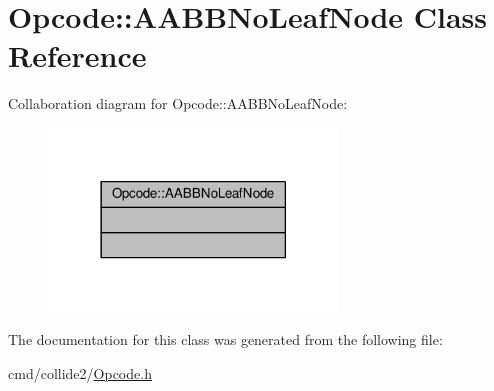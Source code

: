 \hypertarget{classOpcode_1_1AABBNoLeafNode}{}\section{Opcode\+:\+:A\+A\+B\+B\+No\+Leaf\+Node Class Reference}
\label{classOpcode_1_1AABBNoLeafNode}


Collaboration diagram for Opcode\+:\+:A\+A\+B\+B\+No\+Leaf\+Node\+:
\nopagebreak
\begin{figure}[H]
\begin{center}
\leavevmode
\includegraphics[width=218pt]{d8/dd6/classOpcode_1_1AABBNoLeafNode__coll__graph}
\end{center}
\end{figure}


The documentation for this class was generated from the following file\+:\begin{DoxyCompactItemize}
\item 
cmd/collide2/\hyperlink{Opcode_8h}{Opcode.\+h}\end{DoxyCompactItemize}
